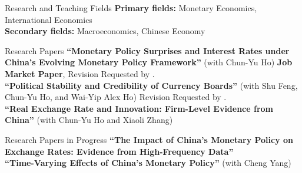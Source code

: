 \documentclass{resume_liang} %
\begin{document}
\begin{rSection}{Research and Teaching Fields}
{\bf Primary fields:} Monetary Economics, International Economics 
\vspace{0.1cm} \\ 
{\bf Secondary fields:} Macroeconomics, Chinese Economy 
\\ 
\end{rSection}
\bigskip  




\begin{rSection}{Research Papers}
\textbf{``Monetary Policy Surprises and Interest Rates under China's Evolving Monetary Policy Framework''} (with Chun-Yu Ho) \textbf{Job Market Paper}, Revision Requested by \textit{\color{blue}{Emerging Markets Review}}.
\vspace{0.1cm} \\
\textbf{``Political Stability and Credibility of Currency Boards''} (with Shu Feng, Chun-Yu Ho, and Wai-Yip Alex Ho) Revision Requested by \textit{\color{blue}{Journal of International Money and Finance}}.
\vspace{0.1cm} \\
\textbf{``Real Exchange Rate and Innovation: Firm-Level Evidence from China''} (with Chun-Yu Ho and Xiaoli Zhang) 
\\ 
\end{rSection}
\bigskip  




\begin{rSection}{Research Papers in Progress}
\textbf{``The Impact of China's Monetary Policy on Exchange Rates: Evidence from High-Frequency Data''}\vspace{0.1cm}
\\
\textbf{``Time-Varying Effects of China's Monetary Policy''} (with Cheng Yang)
\\
\end{rSection}
\bigskip  
\end{document}
